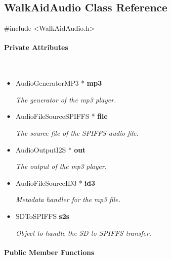 \subsection{WalkAidAudio Class Reference}
\label{subsec:WalkAidAudio}\mbox{}

    \ttfamily{}

    \#include <WalkAidAudio.h>\\

    \rmfamily{}

    \paragraph{Private Attributes}\mbox{}\\

        \begin{itemize}
            \item AudioGeneratorMP3 * \textbf{mp3}
            
                \quad \quad \textit{The generator of the mp3 player.}

            \item AudioFileSourceSPIFFS * \textbf{file}
            
                \quad \quad \textit{The source file of the SPIFFS audio file.}

            \item AudioOutputI2S * \textbf{out}
            
                \quad \quad \textit{The output of the mp3 player.}

            \item AudioFileSourceID3 * \textbf{id3}
            
                \quad \quad \textit{Metadata handler for the mp3 file.}

            \item SDToSPIFFS \textbf{s2s}
            
                \quad \quad \textit{Object to handle the SD to SPIFFS transfer.}\\

        \end{itemize}


    \paragraph{Public Member Functions}\mbox{}\\

